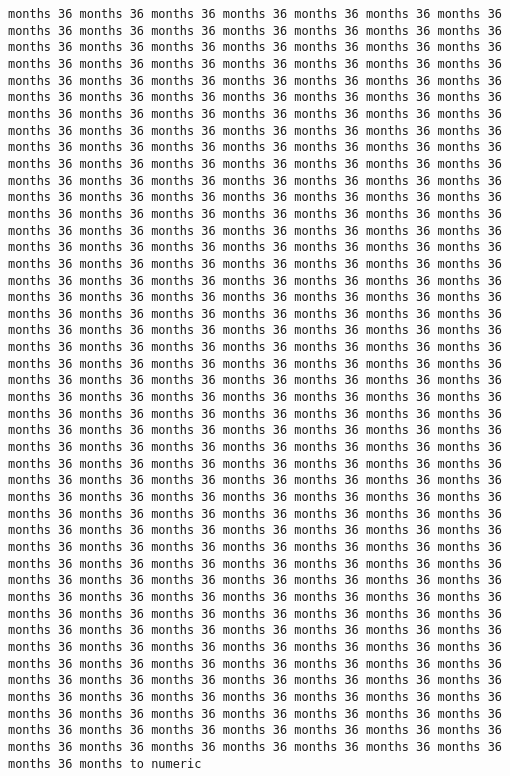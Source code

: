\documentclass[11pt]{article}
\begin{document}
\begin{Verbatim}[commandchars=\\\{\}, frame=single, framerule=2mm, rulecolor=\color{outerrorbackground}]
months 36 months 36 months 36 months 36 months 36 months 36 months 36 months 36 months 36 months 36 months 36 months 36 months 36 months 36 months 36 months 36 months 36 months 36 months 36 months 36 months 36 months 36 months 36 months 36 months 36 months 36 months 36 months 36 months 36 months 36 months 36 months 36 months 36 months 36 months 36 months 36 months 36 months 36 months 36 months 36 months 36 months 36 months 36 months 36 months 36 months 36 months 36 months 36 months 36 months 36 months 36 months 36 months 36 months 36 months 36 months 36 months 36 months 36 months 36 months 36 months 36 months 36 months 36 months 36 months 36 months 36 months 36 months 36 months 36 months 36 months 36 months 36 months 36 months 36 months 36 months 36 months 36 months 36 months 36 months 36 months 36 months 36 months 36 months 36 months 36 months 36 months 36 months 36 months 36 months 36 months 36 months 36 months 36 months 36 months 36 months 36 months 36 months 36 months 36 months 36 months 36 months 36 months 36 months 36 months 36 months 36 months 36 months 36 months 36 months 36 months 36 months 36 months 36 months 36 months 36 months 36 months 36 months 36 months 36 months 36 months 36 months 36 months 36 months 36 months 36 months 36 months 36 months 36 months 36 months 36 months 36 months 36 months 36 months 36 months 36 months 36 months 36 months 36 months 36 months 36 months 36 months 36 months 36 months 36 months 36 months 36 months 36 months 36 months 36 months 36 months 36 months 36 months 36 months 36 months 36 months 36 months 36 months 36 months 36 months 36 months 36 months 36 months 36 months 36 months 36 months 36 months 36 months 36 months 36 months 36 months 36 months 36 months 36 months 36 months 36 months 36 months 36 months 36 months 36 months 36 months 36 months 36 months 36 months 36 months 36 months 36 months 36 months 36 months 36 months 36 months 36 months 36 months 36 months 36 months 36 months 36 months 36 months 36 months 36 months 36 months 36 months 36 months 36 months 36 months 36 months 36 months 36 months 36 months 36 months 36 months 36 months 36 months 36 months 36 months 36 months 36 months 36 months 36 months 36 months 36 months 36 months 36 months 36 months 36 months 36 months 36 months 36 months 36 months 36 months 36 months 36 months 36 months 36 months 36 months 36 months 36 months 36 months 36 months 36 months 36 months 36 months 36 months 36 months 36 months 36 months 36 months 36 months 36 months 36 months 36 months 36 months 36 months 36 months 36 months 36 months 36 months 36 months 36 months 36 months 36 months 36 months 36 months 36 months 36 months 36 months 36 months 36 months 36 months 36 months 36 months 36 months 36 months 36 months 36 months 36 months 36 months 36 months 36 months 36 months 36 months 36 months 36 months 36 months 36 months 36 months 36 months 36 months 36 months 36 months 36 months 36 months 36 months 36 months 36 months 36 months 36 months 36 months 36 months 36 months 36 months 36 months 36 months 36 months 36 months 36 months 36 months 36 months 36 months 36 months 36 months 36 months 36 months 36 months 36 months 36 months 36 months to numeric
    \end{Verbatim}
\end{document}
